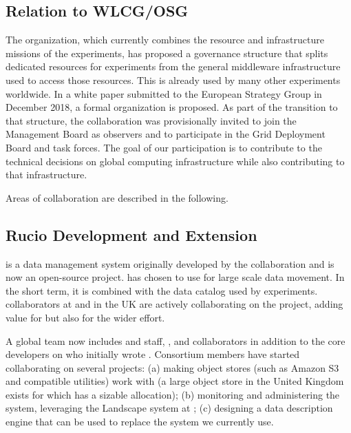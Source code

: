 \subsection{Relation to WLCG/OSG}
The  \cite{Bird:2014ctt} organization, which currently combines the resource and infrastructure missions of the  experiments, has proposed a governance structure that splits dedicated resources for  experiments from the general middleware infrastructure used to access those resources.  This  is already used by many other experiments worldwide.  In a white paper submitted to the European Strategy Group in December 2018\cite{bib:BirdEUStrategy}, a formal  organization is proposed. As part of the transition to that structure, the  collaboration was provisionally invited to join the  Management Board as observers and to participate in the Grid Deployment Board and task forces. The goal of our participation is to contribute to the technical decisions on global computing infrastructure while also contributing to that infrastructure. 

Areas of collaboration are described in the following. 

\subsection{Rucio Development and Extension}

 \cite{Barisits:2019fyl}
is a data management system originally developed by the  collaboration and is now an open-source project.   has chosen to use  for large scale data movement.  In the short term, it is combined with the  data catalog used by  experiments.   collaborators at  and in the UK are actively collaborating on the  project, adding value for  but also for the wider effort.


A global  team now includes  and  staff, , and  collaborators  in addition to the core developers on  who initially wrote .  Consortium members have started collaborating on several projects:  (a) making object stores (such as Amazon S3 and compatible utilities) work with  (a large object store in the United Kingdom exists for which  has a sizable allocation);  (b) monitoring  and administering the  system, leveraging the Landscape system at ;  (c) designing a  data description engine that can be used to replace the  system we currently use.



